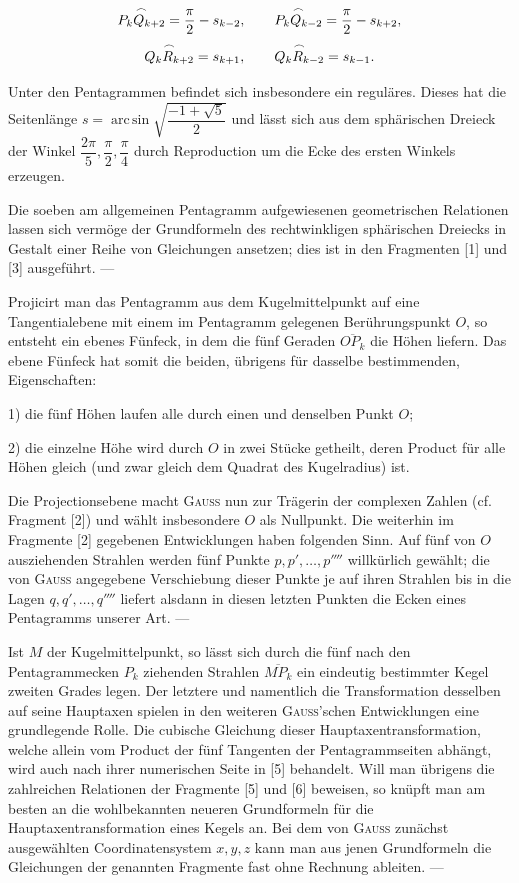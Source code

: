 \[
\overset{\frown}{P_kQ_{k+2}} = \frac{\pi}{2} - s_{k-2}, \qquad \overset{\frown}{P_kQ_{k-2}} = \frac{\pi}{2} - s_{k+2},
\]
\[
\overset{\frown}{Q_kR_{k+2}} = s_{k+1}, \qquad \overset{\frown}{Q_kR_{k-2}} = s_{k-1}.
\]

Unter den Pentagrammen befindet sich insbesondere ein reguläres. Dieses hat die Seitenlänge
$s = \operatorname{arc\,sin}\sqrt{\dfrac{-1+\sqrt{5}}{2}}$ und lässt sich aus dem sphärischen Dreieck der
Winkel $\dfrac{2\pi}{5}, \dfrac{\pi}{2}, \dfrac{\pi}{4}$ durch Reproduction um die Ecke des
ersten Winkels erzeugen.

Die soeben am allgemeinen Pentagramm aufgewiesenen geometrischen Relationen lassen sich
vermöge der Grundformeln des rechtwinkligen sphärischen Dreiecks in Gestalt einer Reihe von
Gleichungen ansetzen; dies ist in den Fragmenten [1] und [3] ausgeführt. ---

Projicirt man das Pentagramm aus dem Kugelmittelpunkt auf eine Tangentialebene mit einem im
Pentagramm gelegenen Berührungspunkt $O$, so entsteht ein ebenes Fünfeck, in dem die fünf
Geraden $\overline{OP_k}$ die Höhen liefern. Das ebene Fünfeck hat somit die beiden,
übrigens für dasselbe bestimmenden, Eigenschaften:

1) die fünf Höhen laufen alle durch einen und denselben Punkt $O$;

2) die einzelne Höhe wird durch $O$ in zwei Stücke getheilt, deren Product für alle Höhen
gleich (und zwar gleich dem Quadrat des Kugelradius) ist.

Die Projectionsebene macht \textsc{Gauss} nun zur Trägerin der complexen Zahlen (cf. Fragment [2])
und wählt insbesondere $O$ als Nullpunkt. Die weiterhin im Fragmente [2] gegebenen
Entwicklungen haben folgenden Sinn. Auf fünf von $O$ ausziehenden Strahlen werden fünf
Punkte $p, p', \ldots, p''''$ willkürlich gewählt; die von \textsc{Gauss} angegebene Verschiebung
dieser Punkte je auf ihren Strahlen bis in die Lagen $q, q', \ldots, q''''$ liefert alsdann
in diesen letzten Punkten die Ecken eines Pentagramms unserer Art. ---

Ist $M$ der Kugelmittelpunkt, so lässt sich durch die fünf nach den Pentagrammecken $P_k$
ziehenden Strahlen $\overline{MP_k}$ ein eindeutig bestimmter Kegel zweiten Grades legen.
Der letztere und namentlich die Transformation desselben auf seine Hauptaxen spielen in den weiteren \textsc{Gauss}'schen Entwicklungen
eine grundlegende Rolle. Die cubische Gleichung dieser Hauptaxentransformation, welche
allein vom Product der fünf Tangenten der Pentagrammseiten abhängt, wird auch nach ihrer
numerischen Seite in [5] behandelt. Will man übrigens die zahlreichen Relationen der
Fragmente [5] und [6] beweisen, so knüpft man am besten an die wohlbekannten neueren
Grundformeln für die Hauptaxentransformation eines Kegels an. Bei dem von \textsc{Gauss} zunächst
ausgewählten Coordinatensystem $x, y, z$ kann man aus jenen Grundformeln die Gleichungen
der genannten Fragmente fast ohne Rechnung ableiten. ---

